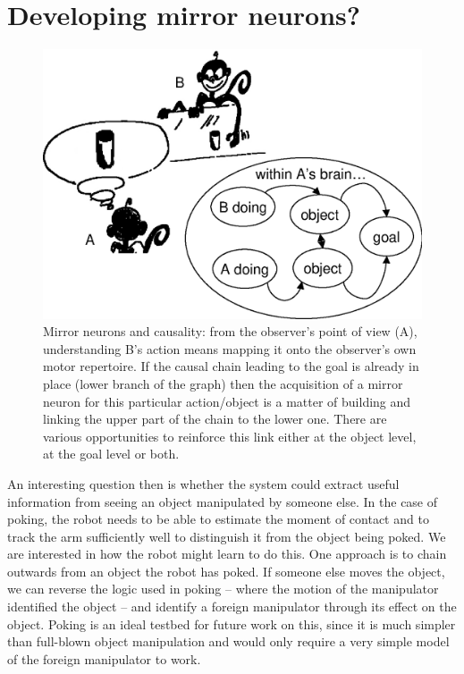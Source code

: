 \section{Developing mirror neurons?}


\begin{figure}[tb]
\begin{center}
\includegraphics[width=\columnwidth]{mirror-monkey.eps}
\caption{ 
\label{fig:mirror-monkey}
%
Mirror neurons and causality: from the observer's point
of view (A), understanding B's action means mapping it onto the
observer's own
motor repertoire. If the causal chain leading to the goal is already
in place (lower branch of the graph) then the acquisition of a
mirror neuron for this particular action/object is a matter of
building and linking the upper part of the chain to the lower one.
There are various opportunities to reinforce this link either at the object
level, at the goal level or both. 
%
}
\end{center}
\end{figure}


An interesting question then is
whether the system could extract useful information from seeing an
object manipulated by someone else.  In the case of poking, the robot
needs to be able to estimate the moment of contact and to track the arm
sufficiently well to distinguish it from the object being poked.  We
are interested in how the robot might learn to do this.  One approach
is to chain outwards from an object the robot has poked.  If someone
else moves the object, we can reverse the logic used in poking --
where the motion of the manipulator identified the object -- and
identify a foreign manipulator through its effect on the object.
Poking is an ideal testbed for future work on this, since it is much
simpler than full-blown object manipulation and would only require a
very simple model of the foreign manipulator to work.

